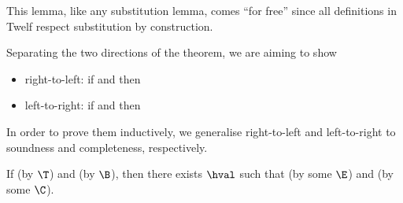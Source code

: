 \Twelf
This lemma, like any substitution lemma, comes ``for free'' since all definitions in Twelf respect substitution by construction.

\vspace{0.5cm}

\noindent Separating the two directions of the theorem, we are aiming to show
\begin{itemize}
	\item[]right-to-left: if \trahb{\benv}{\envnil}{\bexp}{\hexp} and \bev{\envnil}{\bexp}{\n{\nat}} then \hev{\hexp}{\n{\nat}}
	\item[]left-to-right: if \trahb{\benv}{\envnil}{\bexp}{\hexp} and \hev{\hexp}{\n{\nat}} then \bev{\envnil}{\bexp}{\n{\nat}}
\end{itemize}
In order to prove them inductively, we generalise right-to-left and left-to-right to soundness and completeness, respectively.

\begin{lemma}[Soundness]
\label{lem:soundness-hb}
If \trahb{\benv}{\envnil}{\hexp}{\bexp} (by $\T$) and \bev{\benv}{\bexp}{\bval} (by $\B$), then there exists $\hval$ such that \hev{\hexp}{\hval} (by some $\E$) and \corhb{\benv}{\bval}{\hval} (by some $\C$).
\end{lemma}


